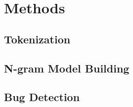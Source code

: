 \chapter{Methods}\label{chap:methods}

\section{Tokenization}

\section{N-gram Model Building}

\section{Bug Detection}
